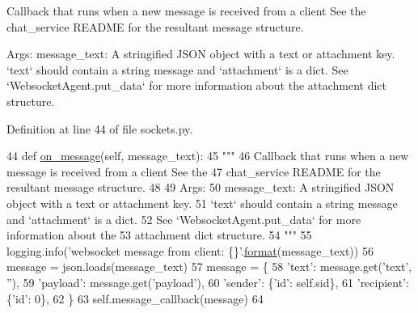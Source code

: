 \begin{DoxyVerb}Callback that runs when a new message is received from a client See the
chat_service README for the resultant message structure.

Args:
    message_text: A stringified JSON object with a text or attachment key.
`text` should contain a string message and `attachment` is a dict.
See `WebsocketAgent.put_data` for more information about the
attachment dict structure.
\end{DoxyVerb}
 

Definition at line 44 of file sockets.\+py.


\begin{DoxyCode}
44     \textcolor{keyword}{def }\hyperlink{namespaceparlai_1_1chat__service_1_1services_1_1terminal__chat_1_1client_a0ef2bb2bd3b966dcdd8402a92b999708}{on\_message}(self, message\_text):
45         \textcolor{stringliteral}{"""}
46 \textcolor{stringliteral}{        Callback that runs when a new message is received from a client See the}
47 \textcolor{stringliteral}{        chat\_service README for the resultant message structure.}
48 \textcolor{stringliteral}{}
49 \textcolor{stringliteral}{        Args:}
50 \textcolor{stringliteral}{            message\_text: A stringified JSON object with a text or attachment key.}
51 \textcolor{stringliteral}{                `text` should contain a string message and `attachment` is a dict.}
52 \textcolor{stringliteral}{                See `WebsocketAgent.put\_data` for more information about the}
53 \textcolor{stringliteral}{                attachment dict structure.}
54 \textcolor{stringliteral}{        """}
55         logging.info(\textcolor{stringliteral}{'websocket message from client: \{\}'}.\hyperlink{namespaceparlai_1_1chat__service_1_1services_1_1messenger_1_1shared__utils_a32e2e2022b824fbaf80c747160b52a76}{format}(message\_text))
56         message = json.loads(message\_text)
57         message = \{
58             \textcolor{stringliteral}{'text'}: message.get(\textcolor{stringliteral}{'text'}, \textcolor{stringliteral}{''}),
59             \textcolor{stringliteral}{'payload'}: message.get(\textcolor{stringliteral}{'payload'}),
60             \textcolor{stringliteral}{'sender'}: \{\textcolor{stringliteral}{'id'}: self.sid\},
61             \textcolor{stringliteral}{'recipient'}: \{\textcolor{stringliteral}{'id'}: 0\},
62         \}
63         self.message\_callback(message)
64 
\end{DoxyCode}
\mbox{\label{classparlai_1_1chat__service_1_1services_1_1websocket_1_1sockets_1_1MessageSocketHandler_a3b5c9e9fc500c312e1895c6220d52ca7}} 
